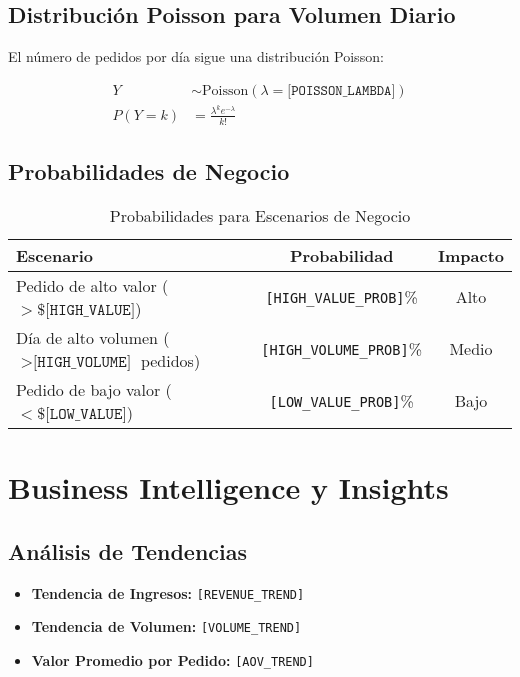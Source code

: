 \documentclass[12pt,a4paper]{article}
\begin{document}
\subsection{Distribución Poisson para Volumen Diario}

El número de pedidos por día sigue una distribución Poisson:

\begin{align}
Y &\sim \text{Poisson}(\lambda = \texttt{[POISSON\_LAMBDA]}) \\
P(Y = k) &= \frac{\lambda^k e^{-\lambda}}{k!}
\end{align}

\subsection{Probabilidades de Negocio}

\begin{table}[H]
\centering
\begin{tabular}{@{}lcc@{}}
\toprule
\textbf{Escenario} & \textbf{Probabilidad} & \textbf{Impacto} \\
\midrule
Pedido de alto valor ($>\$\texttt{[HIGH\_VALUE]}$) & \texttt{[HIGH\_VALUE\_PROB]}\% & Alto \\
Día de alto volumen ($>\texttt{[HIGH\_VOLUME]}$ pedidos) & \texttt{[HIGH\_VOLUME\_PROB]}\% & Medio \\
Pedido de bajo valor ($<\$\texttt{[LOW\_VALUE]}$) & \texttt{[LOW\_VALUE\_PROB]}\% & Bajo \\
\bottomrule
\end{tabular}
\caption{Probabilidades para Escenarios de Negocio}
\label{tab:probabilities}
\end{table}

\section{\textcolor{primaryblue}{Business Intelligence y Insights}}

\subsection{Análisis de Tendencias}

\begin{itemize}
    \item \textbf{Tendencia de Ingresos:} \texttt{[REVENUE\_TREND]}
    \item \textbf{Tendencia de Volumen:} \texttt{[VOLUME\_TREND]}
    \item \textbf{Valor Promedio por Pedido:} \texttt{[AOV\_TREND]}
\end{itemize}
\end{document}
